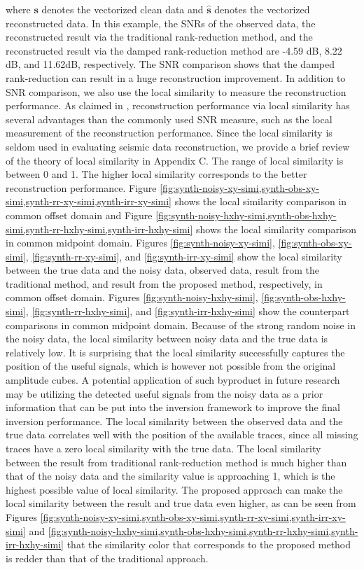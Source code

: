 where $\mathbf{s}$ denotes the vectorized clean data and $\hat{\mathbf{s}}$ denotes the vectorized reconstructed data. In this example, the SNRs of the observed data, the reconstructed result via the traditional rank-reduction method, and the reconstructed result via the damped rank-reduction method are -4.59 dB, 8.22 dB, and 11.62dB, respectively. The SNR comparison shows that the damped rank-reduction can result in a huge reconstruction improvement.  In addition to SNR comparison, we also use the local similarity to measure the reconstruction performance. As claimed in \cite{yangkang2015ortho}, reconstruction performance via local similarity has several advantages than the commonly used SNR measure, such as the local measurement of the reconstruction performance. Since the local similarity is seldom used in evaluating seismic data reconstruction, we provide a brief review of the theory of local similarity in Appendix C. The range of local similarity is between 0 and 1.  The higher local similarity corresponds to the better reconstruction performance. Figure \ref{fig:synth-noisy-xy-simi,synth-obs-xy-simi,synth-rr-xy-simi,synth-irr-xy-simi} shows the local similarity comparison in common offset domain and Figure \ref{fig:synth-noisy-hxhy-simi,synth-obs-hxhy-simi,synth-rr-hxhy-simi,synth-irr-hxhy-simi} shows the local similarity comparison in common midpoint domain. Figures \ref{fig:synth-noisy-xy-simi}, \ref{fig:synth-obs-xy-simi}, \ref{fig:synth-rr-xy-simi}, and \ref{fig:synth-irr-xy-simi} show the local similarity between the true data and the noisy data, observed data, result from the traditional method, and result from the proposed method, respectively, in common offset domain. Figures \ref{fig:synth-noisy-hxhy-simi}, \ref{fig:synth-obs-hxhy-simi}, \ref{fig:synth-rr-hxhy-simi}, and \ref{fig:synth-irr-hxhy-simi} show the counterpart comparisons in common midpoint domain. Because of the strong random noise in the noisy data, the local similarity between noisy data and the true data is relatively low. It is surprising that the local similarity successfully captures the position of the useful signals, which is however not possible from the original amplitude cubes. A potential application of such byproduct in future research may be utilizing the detected useful signals from the noisy data as a prior information that can be put into the inversion framework to improve the final inversion performance. The local similarity between the observed data and the true data correlates well with the position of the available traces, since all missing traces have a zero local similarity with the true data. The local similarity between the result from traditional rank-reduction method is much higher than that of the noisy data and the similarity value is approaching 1, which is the highest possible value of local similarity. The proposed approach can make the local similarity between the result and true data even higher, as can be seen from Figures \ref{fig:synth-noisy-xy-simi,synth-obs-xy-simi,synth-rr-xy-simi,synth-irr-xy-simi} and \ref{fig:synth-noisy-hxhy-simi,synth-obs-hxhy-simi,synth-rr-hxhy-simi,synth-irr-hxhy-simi} that the similarity color that corresponds to the proposed method is redder than that of the traditional approach. 

